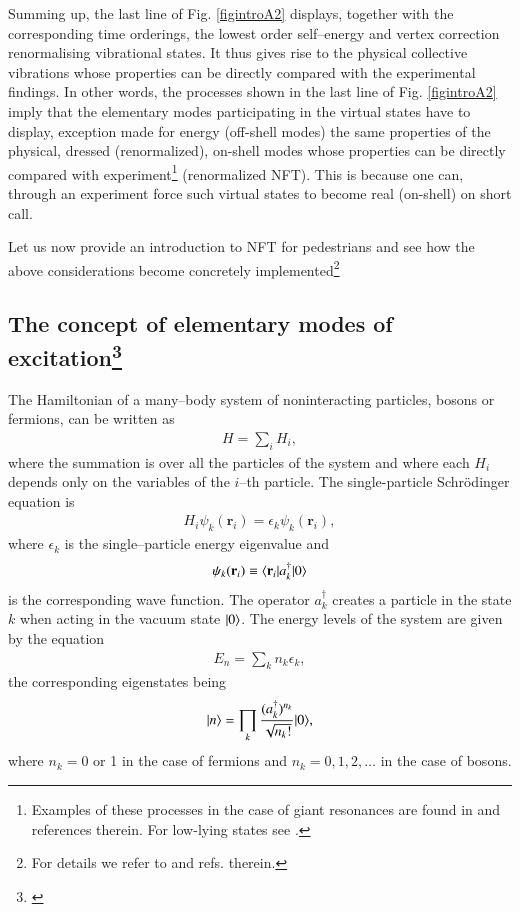 Summing up, the last line of Fig. \ref{figintroA2} displays, together with the corresponding time orderings, the lowest order self--energy and vertex correction renormalising vibrational states. It thus gives rise to the physical collective vibrations whose properties can be directly compared with the experimental findings. In other words, the processes shown in the last line of   Fig. \ref{figintroA2} imply that the elementary modes participating in the virtual states have to display, exception made for energy (off-shell modes) the same properties of the physical, dressed (renormalized), on-shell modes whose properties can be directly compared with experiment\footnote{Examples of these processes in the case of giant resonances are found in \cite{Bortignon:81,Bertsch:83} and references therein. For low-lying states see \cite{Barranco:04}.} (renormalized NFT). This is because one can, through an experiment
force such virtual states to become real (on-shell) on short call.

Let us now provide an introduction to NFT for pedestrians and see how the above considerations become concretely implemented\footnote{For details we refer to \cite{Bortignon:77} and refs. therein.}
\subsection[The concept of elementary modes of excitation]{The concept of elementary modes of excitation\protect\footnote{\cite{Bes:77}}}\label{C1S7.1}
The Hamiltonian of a many--body system of noninteracting particles, bosons or fermions, can be written as
\begin{align}\label{eqC1A1}
H=\sum_iH_i,
\end{align}
where the summation is over all the particles of the system and where each $H_i$ depends only on the variables of the $i$--th particle. The single-particle Schr\"odinger equation is
\begin{align}\label{eqC1A2}
H_i\psi_k(\mathbf r_i)=\epsilon_k \psi_k(\mathbf r_i),
\end{align}
where $\epsilon_k$ is the single--particle energy eigenvalue and 
\begin{align}\label{eqC1A3}
\psi_k(\mathbf r_i)\equiv\langle {\mathbf r_i}|a_k^\dagger|{0} \rangle
\end{align}
is the corresponding wave function. The operator $a_k^\dagger$ creates a particle in the state $k$ when acting in the vacuum state $|{0} \rangle$. The energy levels of the system are given by the equation
\begin{align}\label{eqC1A4}
E_n=\sum_k n_k\epsilon_k,
\end{align}
the corresponding eigenstates being
\begin{align}\label{eqC1A5}
|{n} \rangle=\prod_k\frac{(a_k^\dagger)^{n_k}}{\sqrt{n_k!}}|{0} \rangle,
\end{align}
where $n_k=0$ or 1 in the case of fermions and $n_k=0,1,2,\dots$ in the case of bosons.

